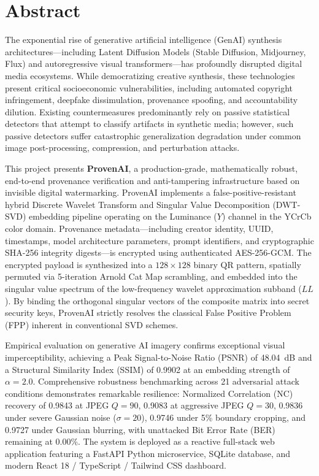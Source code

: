 \documentclass[12pt,a4paper]{report}
\begin{document}
\setcounter{page}{2}

\chapter*{Abstract}

The exponential rise of generative artificial intelligence (GenAI) synthesis architectures---including Latent Diffusion Models (Stable Diffusion, Midjourney, Flux) and autoregressive visual transformers---has profoundly disrupted digital media ecosystems. While democratizing creative synthesis, these technologies present critical socioeconomic vulnerabilities, including automated copyright infringement, deepfake dissimulation, provenance spoofing, and accountability dilution. Existing countermeasures predominantly rely on passive statistical detectors that attempt to classify artifacts in synthetic media; however, such passive detectors suffer catastrophic generalization degradation under common image post-processing, compression, and perturbation attacks. 

This project presents \textbf{ProvenAI}, a production-grade, mathematically robust, end-to-end provenance verification and anti-tampering infrastructure based on invisible digital watermarking. ProvenAI implements a false-positive-resistant hybrid Discrete Wavelet Transform and Singular Value Decomposition (DWT-SVD) embedding pipeline operating on the Luminance ($Y$) channel in the YCrCb color domain. Provenance metadata---including creator identity, UUID, timestamps, model architecture parameters, prompt identifiers, and cryptographic SHA-256 integrity digests---is encrypted using authenticated AES-256-GCM. The encrypted payload is synthesized into a $128 \times 128$ binary QR pattern, spatially permuted via 5-iteration Arnold Cat Map scrambling, and embedded into the singular value spectrum of the low-frequency wavelet approximation subband ($LL$). By binding the orthogonal singular vectors of the composite matrix into secret security keys, ProvenAI strictly resolves the classical False Positive Problem (FPP) inherent in conventional SVD schemes.

Empirical evaluation on generative AI imagery confirms exceptional visual imperceptibility, achieving a Peak Signal-to-Noise Ratio (PSNR) of 48.04~dB and a Structural Similarity Index (SSIM) of 0.9902 at an embedding strength of $\alpha = 2.0$. Comprehensive robustness benchmarking across 21 adversarial attack conditions demonstrates remarkable resilience: Normalized Correlation (NC) recovery of 0.9843 at JPEG $Q=90$, 0.9083 at aggressive JPEG $Q=30$, 0.9836 under severe Gaussian noise ($\sigma=20$), 0.9746 under 5\% boundary cropping, and 0.9727 under Gaussian blurring, with unattacked Bit Error Rate (BER) remaining at 0.00\%. The system is deployed as a reactive full-stack web application featuring a FastAPI Python microservice, SQLite database, and modern React 18 / TypeScript / Tailwind CSS dashboard.
\end{document}
